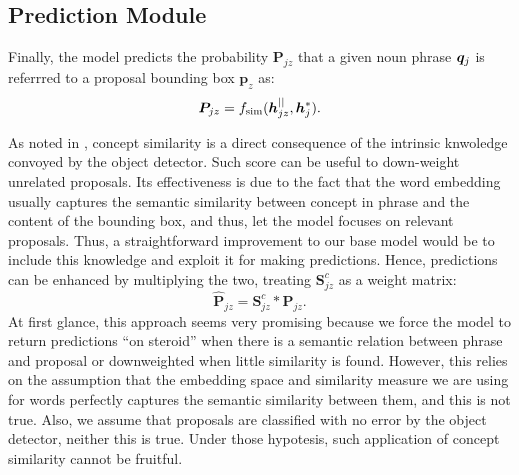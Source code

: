 \subsection{Prediction Module}
\label{subsec:prediction-module}

Finally, the model predicts the probability $\bm{P}_{jz}$ that a given
noun phrase $\bm{q}_j$ is referrred to a proposal bounding box $\bm{p}_z$
as:
\begin{equation}
  \bm{P}_{jz} = f_{\text{sim}} ( \bm{h}^{||}_{jz} , \bm{h}^*_j ).
\end{equation}

As noted in \cite{chen2018knowledge}, concept similarity is a direct
consequence of the intrinsic knwoledge convoyed by the object
detector. Such score can be useful to down-weight unrelated proposals.
Its effectiveness is due to the fact that the word embedding usually
captures the semantic similarity between concept in phrase and the
content of the bounding box, and thus, let the model focuses on
relevant proposals. Thus, a straightforward improvement to our base
model would be to include this knowledge and exploit it for making
predictions. Hence, predictions can be enhanced by multiplying the
two, treating $\bm{S}^c_{jz}$ as a weight matrix:
\begin{equation}
  \bm{\hat{P}}_{jz} = \bm{S}^c_{jz} * \bm{P}_{jz}.
\end{equation}
At first glance, this approach seems very promising because we force
the model to return predictions ``on steroid'' when there is a
semantic relation between phrase and proposal or downweighted when
little similarity is found. However, this relies on the assumption
that the embedding space and similarity measure we are using for words
perfectly captures the semantic similarity between them, and this is
not true. Also, we assume that proposals are classified with no error
by the object detector, neither this is true. Under those hypotesis,
such application of concept similarity cannot be fruitful. 

